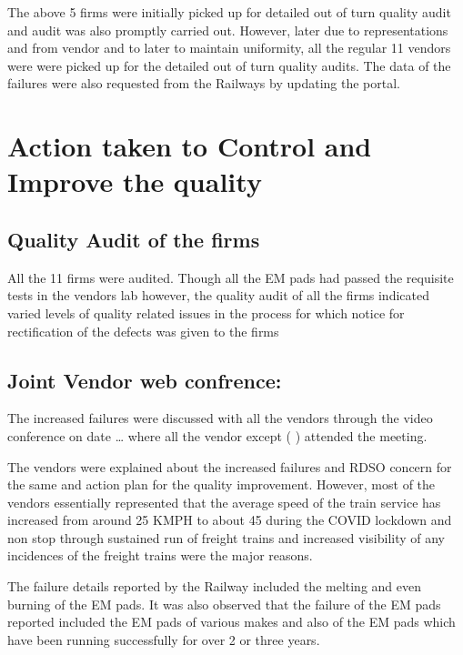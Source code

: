 \documentclass[nofonts,]{tufte-book}
\begin{document}
The above 5 firms were initially picked up for detailed out of turn
quality audit and audit was also promptly carried out. However, later
due to representations and from vendor and to later to maintain
uniformity, all the regular 11 vendors were were picked up for the
detailed out of turn quality audits. The data of the failures were also
requested from the Railways by updating the portal.

\hypertarget{action-taken-to-control-and-improve-the-quality}{%
\chapter{Action taken to Control and Improve the
quality}\label{action-taken-to-control-and-improve-the-quality}}

\hypertarget{quality-audit-of-the-firms}{%
\section{Quality Audit of the firms}\label{quality-audit-of-the-firms}}

All the 11 firms were audited. Though all the EM pads had passed the
requisite tests in the vendors lab however, the quality audit of all the
firms indicated varied levels of quality related issues in the process
for which notice for rectification of the defects was given to the firms

\hypertarget{joint-vendor-web-confrence}{%
\section{Joint Vendor web confrence:}\label{joint-vendor-web-confrence}}

The increased failures were discussed with all the vendors through the
video conference on date \ldots{} where all the vendor except ( )
attended the meeting.

The vendors were explained about the increased failures and RDSO concern
for the same and action plan for the quality improvement. However, most
of the vendors essentially represented that the average speed of the
train service has increased from around 25 KMPH to about 45 during the
COVID lockdown and non stop through sustained run of freight trains and
increased visibility of any incidences of the freight trains were the
major reasons.

The failure details reported by the Railway included the melting and
even burning of the EM pads. It was also observed that the failure of
the EM pads reported included the EM pads of various makes and also of
the EM pads which have been running successfully for over 2 or three
years.
\end{document}
